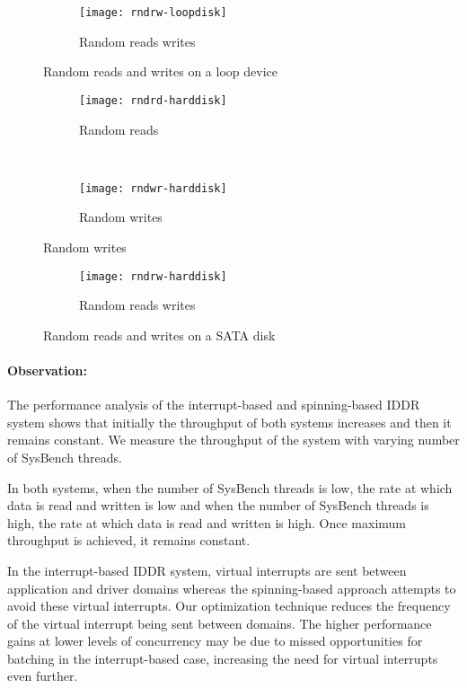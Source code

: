 \begin{figure}[H]
  \ContinuedFloat
  \begin{subfigure}[b]{\textwidth}
  \texttt{[image: rndrw-loopdisk]}
  \caption{Random reads writes}
  \label{subfig:rndrw-loopdisk}
  \end{subfigure}
\caption{Random reads and writes on a loop device}\label{fig:rndloopdisk}
\end{figure}

\begin{figure}[!ht]
\centering
  \begin{subfigure}[b]{\textwidth}
  \texttt{[image: rndrd-harddisk]}
  \caption{Random reads}
  \label{subfig:rndrd-harddisk}
  \end{subfigure}\\
  \begin{subfigure}[b]{\textwidth}
  \texttt{[image: rndwr-harddisk]}
  \caption{Random writes}
  \label{subfig:rndwr-harddisk}
  \end{subfigure}
\end{figure}

\begin{figure}[H]
  \ContinuedFloat
  \begin{subfigure}[b]{\textwidth}
  \texttt{[image: rndrw-harddisk]}
  \caption{Random reads writes}
  \label{subfig:rndrw-harddisk}
  \end{subfigure}
\caption{Random reads and writes on a SATA disk}\label{fig:rndharddisk}
\end{figure}

\paragraph{Observation:}
The performance analysis of the interrupt-based and spinning-based IDDR system
shows that initially the throughput of both systems increases and then it
remains constant. We measure the throughput of the system with varying
number of SysBench threads.

In both systems, when the number of SysBench threads is low,
the rate at which data is read and written is low and when the number of
SysBench threads is high, the rate at which data is read and written is
high.  Once maximum throughput is achieved, it remains constant.

In the interrupt-based IDDR system, virtual interrupts are sent between
application and driver domains whereas the spinning-based approach
attempts to avoid these virtual interrupts.  
Our optimization technique reduces the frequency of the
virtual interrupt being sent between domains. 
The higher performance gains at lower levels of concurrency
may be due to missed opportunities for batching in the interrupt-based case,
increasing the need for virtual interrupts even further.

